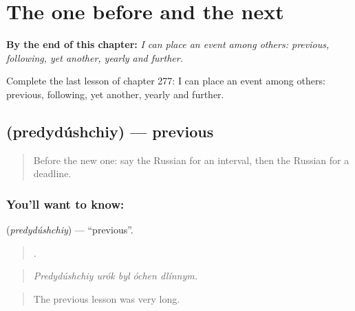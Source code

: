 
\chapter{The one before and the next}
\label{ch:ru-the-one-before-and-the-next}

\begin{chapteropening}
\textbf{By the end of this chapter:} \emph{I can place an event among others: previous, following, yet another, yearly and further.}

Complete the last lesson of chapter 277: I can place an event among others: previous, following, yet another, yearly and further.
\end{chapteropening}

\section[\texorpdfstring{\ru{предыдущий} (predydúshchiy)}{предыдущий (predydúshchiy)}]{ (predydúshchiy) — previous}

\label{lesson:RU-C277-predydushchiy}



\begin{quote}
Before the new one: say the Russian for an interval, then the Russian for a deadline.
\end{quote}

\subsection*{You'll want to know: }
\textbf{} (\emph{predydúshchiy}) — \textquotedblleft{}previous\textquotedblright{}.

\begin{quote}
    .
\end{quote}

\begin{quote}
\emph{Predydúshchiy urók byl óchen dlínnym.}
\end{quote}

\begin{quote}
The previous lesson was very long.
\end{quote}

